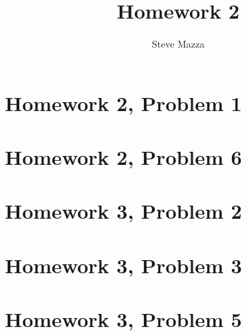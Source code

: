 \documentclass[letterpaper,10pt]{article}
\title{Homework 2}
\author{Steve Mazza}
\begin{document}
\maketitle

\section*{Homework 2, Problem 1}

\section*{Homework 2, Problem 6}

\section*{Homework 3, Problem 2}

\section*{Homework 3, Problem 3}

\section*{Homework 3, Problem 5}
\end{document}
